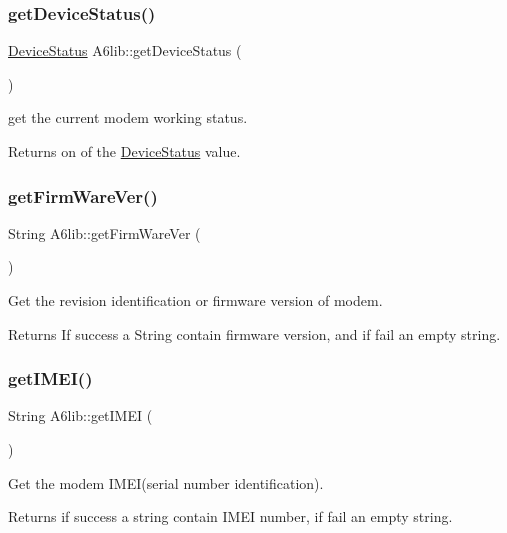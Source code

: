 \subsubsection{\texorpdfstring{get\+Device\+Status()}{getDeviceStatus()}}
{\footnotesize\ttfamily \mbox{\hyperlink{_a6lib_8h_ab202700bbeacce7358281dce3cc27607}{Device\+Status}} A6lib\+::get\+Device\+Status (\begin{DoxyParamCaption}{ }\end{DoxyParamCaption})}

get the current modem working status. \begin{DoxyReturn}{Returns}
on of the \mbox{\hyperlink{_a6lib_8h_ab202700bbeacce7358281dce3cc27607}{Device\+Status}} value. 
\end{DoxyReturn}
\mbox{\label{class_a6lib_a92cc2f3cd1f793bf1bf77a3b528aba81}} 
\subsubsection{\texorpdfstring{get\+Firm\+Ware\+Ver()}{getFirmWareVer()}}
{\footnotesize\ttfamily String A6lib\+::get\+Firm\+Ware\+Ver (\begin{DoxyParamCaption}{ }\end{DoxyParamCaption})}

Get the revision identification or firmware version of modem. \begin{DoxyReturn}{Returns}
If success a String contain firmware version, and if fail an empty string. 
\end{DoxyReturn}
\mbox{\label{class_a6lib_a365df3e93f910171da9d5914ae1997c2}} 
\subsubsection{\texorpdfstring{get\+I\+M\+E\+I()}{getIMEI()}}
{\footnotesize\ttfamily String A6lib\+::get\+I\+M\+EI (\begin{DoxyParamCaption}{ }\end{DoxyParamCaption})}

Get the modem I\+M\+E\+I(serial number identification). \begin{DoxyReturn}{Returns}
if success a string contain I\+M\+EI number, if fail an empty string. 
\end{DoxyReturn}
\mbox{\label{class_a6lib_a22777c9190a6be69c64010d03b022b3c}} 
